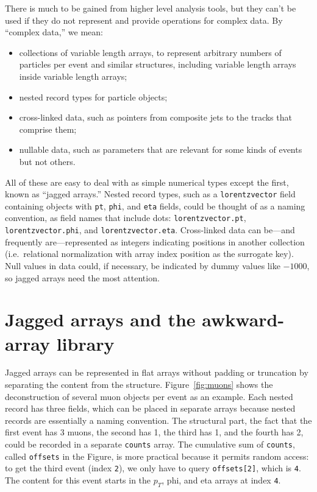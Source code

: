 \documentclass[a4paper]{jpconf}
\begin{document}
There is much to be gained from higher level analysis tools, but they can't be used if they do not represent and provide operations for complex data. By ``complex data,'' we mean:
\begin{itemize}
\item collections of variable length arrays, to represent arbitrary numbers of particles per event and similar structures, including variable length arrays inside variable length arrays;
\item nested record types for particle objects;
\item cross-linked data, such as pointers from composite jets to the tracks that comprise them;
\item nullable data, such as parameters that are relevant for some kinds of events but not others.
\end{itemize}

All of these are easy to deal with as simple numerical types except the first, known as ``jagged arrays.'' Nested record types, such as a {\tt lorentzvector} field containing objects with {\tt pt}, {\tt phi}, and {\tt eta} fields, could be thought of as a naming convention, as field names that include dots: {\tt lorentzvector.pt}, {\tt lorentzvector.phi}, and {\tt lorentzvector.eta}. Cross-linked data can be---and frequently are---represented as integers indicating positions in another collection (i.e.\ relational normalization with array index position as the surrogate key). Null values in data could, if necessary, be indicated by dummy values like $-1000$, so jagged arrays need the most attention.

\section{Jagged arrays and the awkward-array library}

Jagged arrays can be represented in flat arrays without padding or truncation by separating the content from the structure. Figure~\ref{fig:muons} shows the deconstruction of several muon objects per event as an example. Each nested record has three fields, which can be placed in separate arrays because nested records are essentially a naming convention. The structural part, the fact that the first event has 3 muons, the second has 1, the third has 1, and the fourth has 2, could be recorded in a separate {\tt counts} array. The cumulative sum of {\tt counts}, called {\tt offsets} in the Figure, is more practical because it permits random access: to get the third event (index {\tt 2}), we only have to query {\tt offsets[2]}, which is {\tt 4}. The content for this event starts in the $p_T$, phi, and eta arrays at index {\tt 4}.
\end{document}
